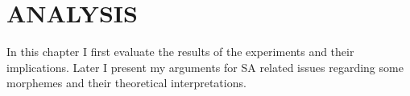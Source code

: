 \chapter{\MakeUppercase{Analysis}}


In this chapter I first evaluate the results of the experiments and their implications. Later I present my arguments for SA related issues regarding some morphemes and their theoretical interpretations. 








